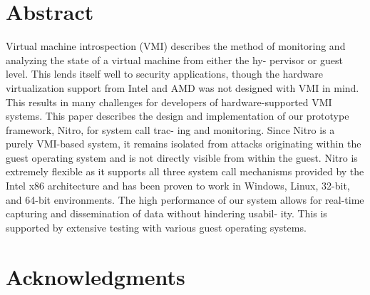 \documentclass{report}
\begin{document}
\begin{spacing}{1.5}











\newpage
{}
\chapter*{Abstract}

{\large
Virtual machine introspection (VMI) describes the method
of monitoring and analyzing the state of a virtual machine from either the hy-
pervisor or guest level. This lends itself well to security applications, though the
hardware virtualization support from Intel and AMD was not designed
with VMI in mind. This results in many challenges for developers of
hardware-supported VMI systems. This paper describes the design and
implementation of our prototype framework, Nitro, for system call trac-
ing and monitoring. Since Nitro is a purely VMI-based system, it remains
isolated from attacks originating within the guest operating system and
is not directly visible from within the guest. Nitro is extremely flexible as
it supports all three system call mechanisms provided by the Intel x86
architecture and has been proven to work in Windows, Linux, 32-bit,
and 64-bit environments. The high performance of our system allows for
real-time capturing and dissemination of data without hindering usabil-
ity. This is supported by extensive testing with various guest operating
systems.
\newline
}























\newpage

\chapter*{Acknowledgments}


\end{spacing}
\end{document}
